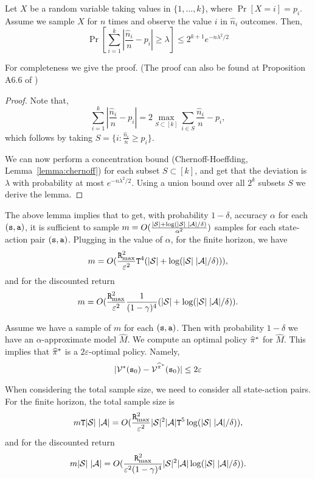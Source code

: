 \begin{lemma}
Let $X$ be a random variable taking values in $\{1, \ldots , k\}$,
where $\Pr[X=i]=p_i$. Assume we sample $X$ for $n$ times and
observe the value $i$ in $\hat{n}_i$ outcomes. Then,
\[
\Pr[\sum_{i=1}^k \left|\frac{\hat{n}_i}{n}-p_i\right|\geq
\lambda]\leq 2^{k+1} e^{-n\lambda^2/2}
\]
\end{lemma}

For completeness we give the proof. (The proof can also be found at
Proposition A6.6 of %
\cite{van1996weak})
\begin{proof}
Note that,
\[
\sum_{i=1}^k |\frac{\hat{n}_i}{n}-p_i| = 2\max_{S\subset [k]}
\sum_{i\in S} \frac{\hat{n}_i}{n}-p_i,
\]
which follows by taking $S=\{i:\frac{\hat{n}_i}{n}\geq p_i\}$.

We can now perform a concentration bound (Chernoff-Hoeffding, Lemma~\ref{lemma:chernoff}) for
each subset $S\subset [k]$, and get that the deviation is $\lambda$
with probability at most $e^{-n\lambda^2/2}$. Using a union bound
over all $2^k$ subsets $S$ we
 derive the lemma.
\end{proof}

The above lemma implies that to get, with probability $1-\delta$,
accuracy $\alpha$ for each $({\tt s},{\tt a})$, it is sufficient to
sample $m=O(\frac{|\mathcal{S}| +
\log(|\mathcal{S}|\;|\mathcal{A}|/\delta)}{\alpha^2} )$ samples for each
state-action pair $({\tt s},{\tt a})$. Plugging in the value of
$\alpha$, for the finite horizon, we have
\[
m=O(\frac{{\tt R}_{\max }^2}{\varepsilon^2} {\tt T}^4 (|\mathcal{S}|+\log
(|\mathcal{S}|\;|\mathcal{A}|/\delta))),
\]
and for the discounted return
\[
m=O(\frac{{\tt R}_{\max }^2}{\varepsilon^2}  \frac{1}{(1-\gamma)^4}
(|\mathcal{S}|+\log (|\mathcal{S}|\;|\mathcal{A}|/\delta)).
\]


Assume we have a sample of $m$ for each $({\tt s},{\tt a})$. Then
with probability $1-\delta$ we have an $\alpha$-approximate model
$\widehat{M}$.
%
We compute an optimal policy $\widehat{\pi}^*$ for
$\widehat{M}$.
%
This implies that $\widehat{\pi}^*$ is a $2\varepsilon$-optimal
policy. Namely,
\[
|\mathcal{V}^*({\tt s}_0)-\mathcal{V}^{\widehat{\pi}^*}({\tt s}_0)|\leq
2\varepsilon
\]


When considering the total sample size, we need to consider all
state-action pairs. For the finite horizon, the total sample size is
\[
m{\tt T}|\mathcal{S}|\;|\mathcal{A}|=O(\frac{{\tt R}_{\max }^2}{\varepsilon^2}
|\mathcal{S}|^2 |\mathcal{A}| {\tt T}^5 \log
(|\mathcal{S}|\;|\mathcal{A}|/\delta)),
\]
and for the discounted return
\[
m|\mathcal{S}|\;|\mathcal{A}|=O(\frac{{\tt R}_{\max }^2}{\varepsilon^2(1-\gamma)^4} |\mathcal{S}|^2 |\mathcal{A}|  \log(|\mathcal{S}|\;|\mathcal{A}|/\delta)).
\]

